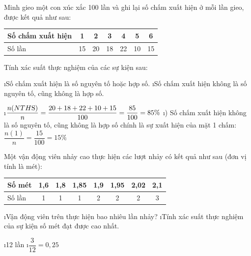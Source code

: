 \begin{bt}
	Minh gieo một con xúc xắc 100 lần và ghi lại số chấm xuất hiện ở mỗi lần gieo, được kết quả như sau:
	\begin{center}
		\begin{tabular}{|l|c|c|c|c|c|c|}
			\hline
			Số chấm xuất hiện&	1&	2&	3&	4&	5&	6\\
			\hline
			Số lần&	15&	20&	18&	22&	10&	15\\
			\hline
		\end{tabular}
	\end{center}
	Tính xác suất thực nghiệm của các sự kiện sau:
	\begin{enumerate}[a),leftmargin=*]
		\i Số chấm xuất hiện là số nguyên tố hoặc hợp số.
		\i Số chấm xuất hiện không là số nguyên tố, cũng không là hợp số.
	\end{enumerate}
	\begin{loigiaichuong41}
		\begin{enumerate}[a),leftmargin=*]
			\i $\dfrac{{n(NTH{\rm{S}})}}{n} = \dfrac{{20 + 18 + 22 + 10 + 15}}{{100}} = \dfrac{{85}}{{100}} = 85\% $
			\i ) Số chấm xuất hiện không là số nguyên tố, cũng không là hợp số chính là sự xuất hiện của mặt 1 chấm: $\dfrac{{n(1)}}{n} = \dfrac{{15}}{{100}} = 15\%$
		\end{enumerate}
	\end{loigiaichuong41}
\end{bt}
\begin{bt}
	Một vận động viên nhảy cao thực hiện các lượt nhảy có kết quả như sau (đơn vị tính là mét): 
	\begin{center}
		\begin{tabular}{|l|c|c|c|c|c|c|c|}
			\hline
			Số mét & 1,6 & 1,8& 1,85& 1,9 & 1,95 & 2,02& 2,1\\
			\hline
			Số lần &1&1&1&2&2&2&3\\
			\hline
		\end{tabular}
	\end{center} 
	\begin{enumerate}[a),leftmargin=*]
		\i Vận động viên trên thực hiện bao nhiêu lần nhảy?
		\i Tính xác suất thực nghiệm của sự kiện số mét đạt được cao nhất.
	\end{enumerate}
	\begin{loigiaichuong41}
		\begin{enumerate}[a),leftmargin=*]
			\i 12 lần
			\i $\dfrac{3}{12} = 0,25$
		\end{enumerate}
	\end{loigiaichuong41}
\end{bt}
